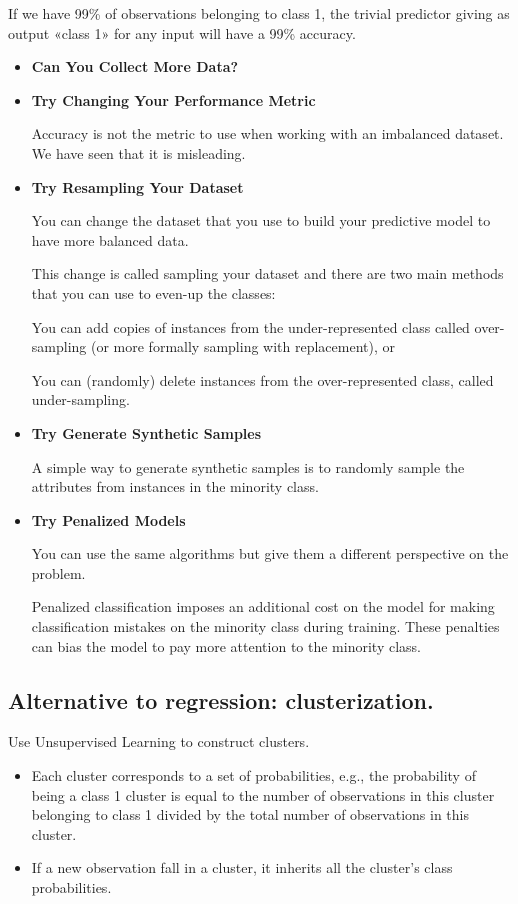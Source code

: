 If we have 99\% of observations belonging to class 1, the trivial predictor giving as output «class 1» for any input will have a 99\% accuracy.

\begin{itemize}
    \item \textbf{Can You Collect More Data?}
    \item \textbf{Try Changing Your Performance Metric}
          
          Accuracy is not the metric to use when working with an imbalanced dataset. We have seen that it is misleading.
    \item \textbf{Try Resampling Your Dataset}
          
          You can change the dataset that you use to build your predictive model to have more balanced data.
          
          This change is called sampling your dataset and there are two main methods that you can use to even-up the classes:
          
          You can add copies of instances from the under-represented class called over-sampling (or more formally sampling with replacement), or
          
          You can (randomly) delete instances from the over-represented class, called under-sampling.
    \item \textbf{Try Generate Synthetic Samples}
          
          A simple way to generate synthetic samples is to randomly sample the attributes from instances in the minority class.
    \item \textbf{Try Penalized Models}
          
          You can use the same algorithms but give them a different perspective on the problem.
          
          Penalized classification imposes an additional cost on the model for making classification mistakes on the minority class during training. These penalties can bias the model to pay more attention to the minority class.
\end{itemize}

\subsection{Alternative to regression: clusterization.}

Use Unsupervised Learning to construct clusters.
\begin{itemize}
    \item Each cluster corresponds to a set of probabilities, e.g., the probability of being a class 1 cluster is equal to the number of observations in this cluster belonging to class 1 divided by the total number of observations in this cluster.
    \item If a new observation fall in a cluster, it inherits all the cluster’s class probabilities.
\end{itemize}

